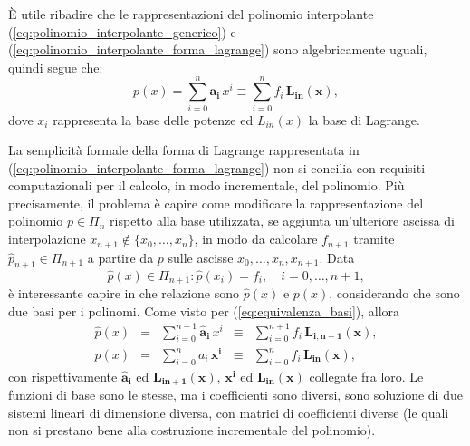 \begin{remark}
	È utile ribadire che le rappresentazioni del polinomio interpolante (\ref{eq:polinomio_interpolante_generico}) e (\ref{eq:polinomio_interpolante_forma_lagrange}) sono algebricamente uguali, quindi segue che: 
	\begin{equation}\label{eq:equivalenza_basi}
		p(x)=\sum_{i=0}^n \boldsymbol{a_i}\, x^i \equiv \sum_{i=0}^n f_i\, \boldsymbol{L_{in}(x)},
	\end{equation}
	dove $x_i$ rappresenta la base delle potenze ed $L_{in}(x)$ la base di Lagrange.
\end{remark}


La semplicità formale della forma di Lagrange rappresentata in (\ref{eq:polinomio_interpolante_forma_lagrange}) non si concilia con requisiti computazionali per il calcolo, in modo incrementale, del polinomio. Più precisamente, il problema è capire come modificare la rappresentazione del polinomio $p\in\Pi_n$ rispetto alla base utilizzata, se aggiunta un'ulteriore ascissa di interpolazione $x_{n+1}\notin\{x_0,\hdots,x_n\}$, in modo da calcolare $f_{n+1}$ tramite $\widehat{p}_{n+1}\in\Pi_{n+1}$ a partire da $p$ sulle ascisse $x_0,\hdots,x_n, x_{n+1}$. Data
\begin{equation*}
	\widehat{p}(x)\in\Pi_{n+1}:\widehat{p}(x_i)=f_i,\quad i=0,\hdots,n+1,
\end{equation*}
è interessante capire in che relazione sono $\widehat{p}(x)$ e $p(x)$, considerando che sono due basi per i polinomi. Come visto per (\ref{eq:equivalenza_basi}), allora
\begin{equation}
    \begin{matrix}
         \widehat{p}(x)&=&\sum_{i=0}^{n+1}\boldsymbol{\widehat{a}_i}\, x^i&\equiv&\sum_{i=0}^{n+1} f_i\, \boldsymbol{L_{i,n+1}(x)},\\
        p(x)&=&\sum_{i=0}^n a_i\,\boldsymbol{x^i}&\equiv&\sum_{i=0}^n f_i\, \boldsymbol{L_{in}(x)},
    \end{matrix}
\end{equation}
con rispettivamente $\boldsymbol{\widehat{a}_i}$ ed $\boldsymbol{L_{in+1}(x)}$, $\boldsymbol{x^i}$ ed $\boldsymbol{L_{in}(x)}$ collegate fra loro.
Le funzioni di base sono le stesse, ma i coefficienti sono diversi, sono soluzione di due sistemi lineari di dimensione diversa, con matrici di coefficienti diverse (le quali non si prestano bene alla costruzione incrementale del polinomio). 

